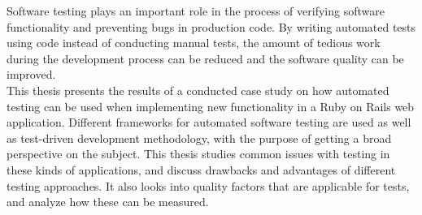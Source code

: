 Software testing plays an important role in the process of verifying
software functionality and preventing bugs in production code. By
writing automated tests using code instead of conducting manual tests,
the amount of tedious work during the development process can be reduced
and the software quality can be improved.\\

This thesis presents the results of a conducted case study on how
automated testing can be used when implementing new functionality in a
Ruby on Rails web application. Different frameworks for automated
software testing are used as well as test-driven development
methodology, with the purpose of getting a broad perspective on the
subject. This thesis studies common issues with testing in these kinds of
applications, and discuss drawbacks and advantages of different testing
approaches. It also looks into quality factors that are applicable for
tests, and analyze how these can be measured.\\

